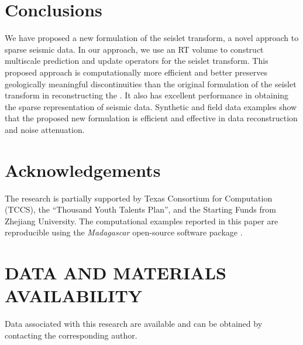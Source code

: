 \section{Conclusions}
    We have proposed a new formulation of the seislet transform, a novel 
    approach to sparse seismic data. 
    In our approach, we use an RT volume to construct multiscale prediction and 
    update operators for the seislet transform. 
    This proposed approach is computationally more efficient and better 
    preserves geologically meaningful discontinuities than the original 
    formulation of the seislet transform in reconstructing the . 
    It also has excellent performance in obtaining the sparse representation of
    seismic data.
    Synthetic and field data examples show that the proposed new 
    formulation is efficient and effective in data reconstruction and noise 
    attenuation.

\section{Acknowledgements}
    The research is partially supported by Texas Consortium for Computation (TCCS), the “Thousand Youth Talents Plan”, and the Starting Funds from Zhejiang University. The computational examples reported in this paper are reproducible using the \emph{Madagascar} open-source software package \cite[]{Fomel2013}. 
    
\section{DATA AND MATERIALS AVAILABILITY}
Data associated with this research are available and can be obtained by contacting the corresponding author. 



